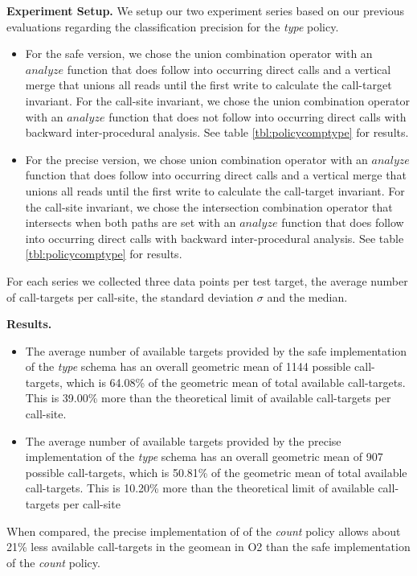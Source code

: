 \textbf{Experiment Setup.} We setup our two experiment series based on our previous evaluations regarding the classification precision for the \textit{type} policy.
\begin{itemize}
\item For the safe version, we chose the union combination operator with an $analyze$ function that does follow into occurring direct calls  and a vertical merge that unions all reads until the first write to calculate the call-target invariant. For the call-site invariant, we chose the union combination operator with an $analyze$ function that does not follow into occurring direct calls  with backward inter-procedural analysis.  See table \ref{tbl:policycomptype} for results. 
\item For the precise version, we chose union combination operator with an $analyze$ function that does follow into occurring direct calls  and a vertical merge that unions all reads until the first write to calculate the call-target invariant. For the call-site invariant, we chose the intersection combination operator that intersects when both paths are set with an $analyze$ function that does follow into occurring direct calls with backward inter-procedural analysis. See table \ref{tbl:policycomptype} for results. 
\end{itemize}
For each series we collected three data points per test target, the average number of call-targets per call-site, the standard deviation $\sigma$ and the median.

\textbf{Results.}
\begin{itemize}
\item The average number of available targets provided by the safe implementation of the \textit{type} schema has an overall geometric mean of  1144 possible call-targets, which is 64.08\% of the geometric mean of total available call-targets. This is 39.00\% more than the theoretical limit of available call-targets per call-site.
\item The average number of available targets provided by the precise implementation of the \textit{type} schema has an overall geometric mean of  907 possible call-targets, which is 50.81\% of the geometric mean of total available call-targets. This is 10.20\% more than the theoretical limit of available call-targets per call-site
\end{itemize}

When compared, the precise implementation of of the \textit{count} policy allows about 21\% less available call-targets in the geomean in O2 than the safe implementation of the \textit{count} policy.


